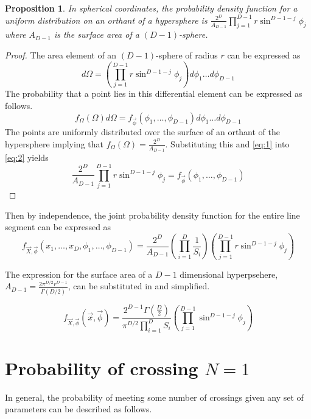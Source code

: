 \documentclass{article}
\newtheorem{proposition}{Proposition}
\begin{document}
\begin{proposition}
In spherical coordinates, the probability density function for a uniform distribution on an orthant of a hypersphere is $\frac{2^D}{A_{D-1}}\prod_{j=1}^{D-1}r\sin^{D-1-j}\phi_j$ where
$A_{D-1}$ is the surface area of a $(D-1)$-sphere.
\end{proposition}
\begin{proof}
	The area element of an $(D-1)$-sphere of radius $r$ can be expressed as 
	\begin{equation} \label{eq:1}
	d\Omega = \left(\prod_{j=1}^{D-1}r\sin^{D-1-j}\phi_j\right)d\phi_1 \hdots d\phi_{D-1}
	\end{equation}
	The probability that a point lies in this differential element can be expressed as follows.
	\begin{equation} \label{eq:2}
	f_{\Omega}(\Omega)d\Omega = f_{\vec{\phi}}(\phi_1, \hdots, \phi_{D-1})d\phi_1 \hdots d\phi_{D-1}
	\end{equation}
	The points are uniformly distributed over the surface of an orthant of the hypersphere implying that $f_{\Omega}(\Omega) = \frac{2^D}{A_{D-1}}$. Substituting this and
	\ref{eq:1} into \ref{eq:2} yields
	\begin{equation}
	\frac{2^D}{A_{D-1}}\prod_{j=1}^{D-1}r\sin^{D-1-j}\phi_j = f_{\vec{\phi}}(\phi_1, \hdots, \phi_{D-1})
	\end{equation}
\end{proof}

Then by independence, the joint probability density function for the entire line segment can be expressed as 
\begin{equation} 
	f_{\vec{X},\vec{\phi}}(x_1, \hdots, x_D, \phi_1, \hdots, \phi_{D-1}) = \frac{2^D}{A_{D-1}}\left(\prod_{i=1}^D\frac{1}{S_i}\right)\left(\prod_{j=1}^{D-1}r\sin^{D-1-j}\phi_j\right)
\end{equation} 

The expression for the surface area of a $D-1$ dimensional hyperpsehere, $A_{D-1}=\frac{2\pi^{D/2}r^{D-1}}{\Gamma(D/2)}$,
can be substituted in and simplified.

\begin{equation}\label{eq:general pdf}
	f_{\vec{X},\vec{\phi}}(\vec{x}, \vec{\phi}) = \frac{2^{D-1}\Gamma(\frac{D}{2})}{\pi^{D/2}\prod_{i=1}^DS_i} \left(\prod_{j=1}^{D-1}\sin^{D-1-j}\phi_j\right)
\end{equation}

\section{Probability of crossing $N=1$}
In general, the probability of meeting some number of crossings given any set of parameters can be described as follows.
\end{document}
